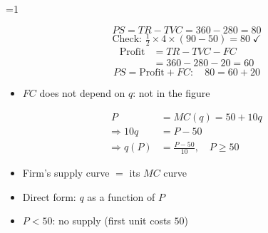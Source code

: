 \documentclass{beamer}
\newcommand{\showanswers}{0}
\begin{document}
\ifnum\showanswers=1
\begin{frame}[plain,label=w2_ans_q12b]
  \Large
  \[
    \tag{M7}\;PS = TR - TVC = 360 - 280 = 80
  \]
  \[
    \tag{M8}\;\text{Check: } \tfrac{1}{2} \times 4 \times (90 - 50) = 80 \;\checkmark
  \]
  \begin{align*}
    \tag{M9}\;\text{Profit} &= TR - TVC - FC\\
                            &= 360 - 280 - 20 = 60
  \end{align*}
  \[
    \tag{M10}\;PS = \text{Profit} + FC: \quad 80 = 60 + 20
  \]

  \vspace{0.3em}
  \begin{itemize}\Large
    \item $FC$ does not depend on $q$: not in the figure
  \end{itemize}
\end{frame}
\fi

\begin{frame}[plain,label=w2_wt1_firm]
  \Large
  \begin{align*}
    \tag{1}\;P &= MC(q) = 50 + 10q\\
    \Rightarrow 10q &= P - 50\\
    \Rightarrow q(P) &= \frac{P - 50}{10}, \quad P \ge 50
  \end{align*}

  \vspace{0.5em}
  \begin{itemize}\Large
    \item Firm's supply curve $=$ its $MC$ curve
    \item Direct form: $q$ as a function of $P$
    \item $P < 50$: no supply (first unit costs $50$)
  \end{itemize}
\end{frame}
\end{document}
